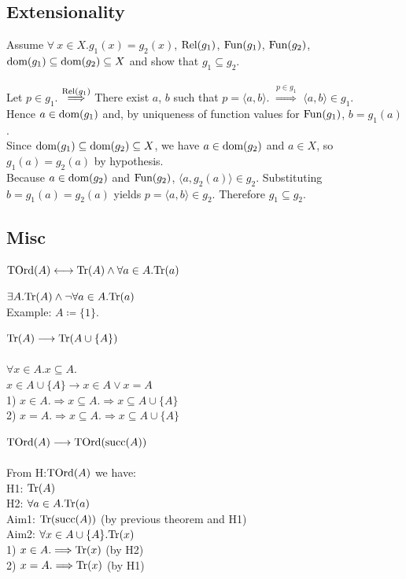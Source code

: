 \documentclass[10pt,a4paper]{article}
\begin{document}
\subsection{Extensionality}
\begin{theorem}
Assume $\forall~x\in X. g_1(x)=g_2(x)$, ${\textrm{Rel}}(g_1)$, ${\textrm{Fun}}(g_1)$, ${\textrm{Fun}}(g_2)$, ${\textrm{dom}}(g_1)\subseteq{\textrm{dom}}(g_2)\subseteq X$ and show that $g_1\subseteq g_2$.\\
\myprf\\
Let $p\in g_1$.
$\stackrel{{\textrm{Rel}}(g_1)}{\Longrightarrow}$
There exist $a$, $b$ such that $p=\langle a, b\rangle$.
$\stackrel{p\in g_1}{\Longrightarrow}$ $\langle a, b\rangle\in g_1$.
\\
Hence $a\in{\textrm{dom}}(g_1)$ and, by uniqueness of function values for ${\textrm{Fun}}(g_1)$, $b = g_1(a)$.
\\
Since ${\textrm{dom}}(g_1)\subseteq{\textrm{dom}}(g_2)\subseteq X$, we have $a\in{\textrm{dom}}(g_2)$ and $a\in X$, so $g_1(a)=g_2(a)$ by hypothesis.
\\
Because $a\in{\textrm{dom}}(g_2)$ and ${\textrm{Fun}}(g_2)$, $\langle a, g_2(a)\rangle\in g_2$. Substituting $b = g_1(a) = g_2(a)$ yields $p = \langle a, b\rangle \in g_2$. Therefore $g_1\subseteq g_2$.
\\\myqed 
\end{theorem}
\subsection{Misc}
\begin{definition}
${\textrm{TOrd}}(A) \longleftrightarrow {\textrm{Tr}}(A)\land \forall a\in A. {\textrm{Tr}}(a)$
\end{definition}
\begin{theorem}
$\exists A. {\textrm{Tr}}(A) \land \neg \forall a\in A. {\textrm{Tr}}(a)$
\\Example: $A\coloneqq \{1\}$.
\end{theorem}
\begin{theorem}
${\textrm{Tr}}(A) \longrightarrow {\textrm{Tr}}(A\cup\{A\})$
\\\myprf
\\$\forall x\in A.x\subseteq A.$
\\$x\in A\cup\{A\} \longrightarrow x\in A \lor x=A$
\\1) $x\in A. \Longrightarrow x\subseteq A. \Longrightarrow x\subseteq A\cup\{A\}$
\\2) $x = A. \Longrightarrow x\subseteq A. \Longrightarrow x\subseteq A\cup\{A\}$
\\\myqed
\end{theorem}
\begin{theorem}
  $ {\textrm{TOrd}}(A) \longrightarrow {\textrm{TOrd}}({\textrm{succ}}(A))$
\\\myprf
\\From H:${\textrm{TOrd}}(A)$ we have:
\\H1: ${\textrm{Tr}}(A)$
\\H2: $\forall a\in A. {\textrm{Tr}}(a)$
\\Aim1: ${\textrm{Tr}}({\textrm{succ}}(A))$ (by previous theorem and H1)
\\Aim2: $\forall x\in A\cup\{A\}. {\textrm{Tr}}(x)$
\\1) $x\in A. \Longrightarrow {\textrm{Tr}}(x)$ (by H2)
\\2) $x = A. \Longrightarrow {\textrm{Tr}}(x)$ (by H1) %
\\\myqed
\end{theorem}
\end{document}
